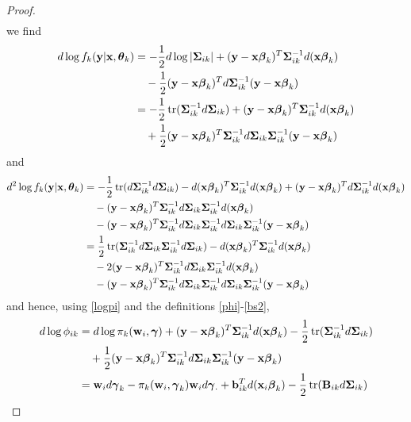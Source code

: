 \begin{proof}
\begin{align*}
\end{align*}
we find 
\begin{align*}
d\log f_{k}(\mathbf y|\mathbf x,\boldsymbol\theta_{k})&=-\frac{1}{2}d\log|\boldsymbol\Sigma_{ik}|+(\mathbf y-\mathbf x\boldsymbol \beta_{k})^{T}\boldsymbol\Sigma_{ik}^{-1}d(\mathbf x\boldsymbol \beta_{k})\\
&\quad-\frac{1}{2}(\mathbf y-\mathbf x\boldsymbol \beta_{k})^{T}d\boldsymbol\Sigma_{ik}^{-1}(\mathbf y-\mathbf x\boldsymbol\beta_{k})\\
&=-\frac{1}{2}\operatorname{tr}(\boldsymbol\Sigma_{ik}^{-1}d\boldsymbol\Sigma_{ik})+(\mathbf y-\mathbf x\boldsymbol \beta_{k})^{T}\boldsymbol\Sigma_{ik}^{-1}d(\mathbf x\boldsymbol \beta_{k})\\
&\quad+\frac{1}{2}(\mathbf y-\mathbf x\boldsymbol \beta_{k})^{T}\boldsymbol\Sigma_{ik}^{-1}d\boldsymbol\Sigma_{ik}\boldsymbol\Sigma_{ik}^{-1}(\mathbf y-\mathbf x\boldsymbol\beta_{k})\\
\end{align*}
and
\begin{align*}
d^{2}\log f_{k}(\mathbf y|\mathbf x,\boldsymbol\theta_{k})&=-\frac{1}{2}\operatorname{tr}(d\boldsymbol\Sigma_{ik}^{-1}d\boldsymbol\Sigma_{ik})-d(\mathbf x\boldsymbol \beta_{k})^{T}\boldsymbol\Sigma_{ik}^{-1}d(\mathbf x\boldsymbol \beta_{k})+(\mathbf y-\mathbf x\boldsymbol \beta_{k})^{T}d\boldsymbol\Sigma_{ik}^{-1}d(\mathbf x\boldsymbol \beta_{k})\\
&\quad-(\mathbf y-\mathbf x\boldsymbol \beta_{k})^{T}\boldsymbol\Sigma_{ik}^{-1}d\boldsymbol\Sigma_{ik}\boldsymbol\Sigma_{ik}^{-1}d(\mathbf x\boldsymbol\beta_{k})\\
&\quad-(\mathbf y-\mathbf x\boldsymbol \beta_{k})^{T}\boldsymbol\Sigma_{ik}^{-1}d\boldsymbol\Sigma_{ik}\boldsymbol\Sigma_{ik}^{-1}d\boldsymbol\Sigma_{ik}\boldsymbol\Sigma_{ik}^{-1}(\mathbf y-\mathbf x\boldsymbol\beta_{k})\\
&=\frac{1}{2}\operatorname{tr}(\boldsymbol\Sigma_{ik}^{-1}d\boldsymbol\Sigma_{ik}\boldsymbol\Sigma_{ik}^{-1}d\boldsymbol\Sigma_{ik})-d(\mathbf x\boldsymbol \beta_{k})^{T}\boldsymbol\Sigma_{ik}^{-1}d(\mathbf x\boldsymbol \beta_{k})\\
&\quad-2(\mathbf y-\mathbf x\boldsymbol \beta_{k})^{T}\boldsymbol\Sigma_{ik}^{-1}d\boldsymbol\Sigma_{ik}\boldsymbol\Sigma_{ik}^{-1}d(\mathbf x\boldsymbol\beta_{k})\\
&\quad-(\mathbf y-\mathbf x\boldsymbol \beta_{k})^{T}\boldsymbol\Sigma_{ik}^{-1}d\boldsymbol\Sigma_{ik}\boldsymbol\Sigma_{ik}^{-1}d\boldsymbol\Sigma_{ik}\boldsymbol\Sigma_{ik}^{-1}(\mathbf y-\mathbf x\boldsymbol\beta_{k})\\
\end{align*}
and hence, using \eqref{logpi} and the definitions \eqref{phi}-\eqref{bs2},
\begin{align*}
d\log \phi_{ik}&=d\log \pi_{k}(\B w_{i},\BS\gamma)+(\B y-\B x\BS \beta_{k})^{T}\BS\Sigma_{ik}^{-1}d(\B x\BS \beta_{k})-\frac{1}{2}\tr(\BS\Sigma_{ik}^{-1}d\BS\Sigma_{ik})\\
&\quad+\frac{1}{2}(\B y-\B x\BS \beta_{k})^{T}\BS\Sigma_{ik}^{-1}d\BS\Sigma_{ik}\BS\Sigma_{ik}^{-1}(\B y-\B x\BS\beta_{k})\\
&=\B w_{i} d\BS \gamma_{k} -\pi_{k}(\B w_{i},\BS\gamma_k)\B w_{i}d\BS\gamma_{\cdot}+\B b^{T}_{ik}d(\B x_{i}\BS \beta_{k})-\frac{1}{2}\tr(\B B_{ik}d\BS\Sigma_{ik})

\end{align*}
\end{proof}
